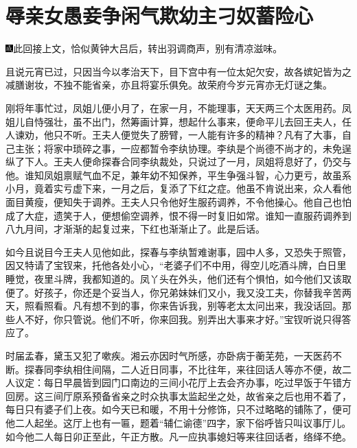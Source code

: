 

\chapter{辱亲女愚妾争闲气\hspace{.5em}欺幼主刁奴蓄险心}

{\includegraphics[width=3mm]{../Images/00005}此回接上文，恰似黄钟大吕后，转出羽调商声，别有清凉滋味。}

且说元宵已过，只因当今以孝治天下，目下宫中有一位太妃欠安，故各嫔妃皆为之减膳谢妆，不独不能省亲，亦且将宴乐俱免。故荣府今岁元宵亦无灯谜之集。

刚将年事忙过，凤姐儿便小月了，在家一月，不能理事，天天两三个太医用药。凤姐儿自恃强壮，虽不出门，然筹画计算，想起什么事来，便命平儿去回王夫人，任人谏劝，他只不听。王夫人便觉失了膀臂，一人能有许多的精神？凡有了大事，自己主张；将家中琐碎之事，一应都暂令李纨协理。李纨是个尚德不尚才的，未免逞纵了下人。王夫人便命探春合同李纨裁处，只说过了一月，凤姐将息好了，仍交与他。谁知凤姐禀赋气血不足，兼年幼不知保养，平生争强斗智，心力更亏，故虽系小月，竟着实亏虚下来，一月之后，复添了下红之症。他虽不肯说出来，众人看他面目黄瘦，便知失于调养。王夫人只令他好生服药调养，不令他操心。他自己也怕成了大症，遗笑于人，便想偷空调养，恨不得一时复旧如常。谁知一直服药调养到八九月间，才渐渐的起复过来，下红也渐渐止了。此是后话。

如今且说目今王夫人见他如此，探春与李纨暂难谢事，园中人多，又恐失于照管，因又特请了宝钗来，托他各处小心，``老婆子们不中用，得空儿吃酒斗牌，白日里睡觉，夜里斗牌，我都知道的。凤丫头在外头，他们还有个惧怕，如今他们又该取便了。好孩子，你还是个妥当人，你兄弟妹妹们又小，我又没工夫，你替我辛苦两天，照看照看。凡有想不到的事，你来告诉我，别等老太太问出来，我没话回。那些人不好，你只管说。他们不听，你来回我。别弄出大事来才好。''宝钗听说只得答应了。

时届孟春，黛玉又犯了嗽疾。湘云亦因时气所感，亦卧病于蘅芜苑，一天医药不断。探春同李纨相住间隔，二人近日同事，不比往年，来往回话人等亦不便，故二人议定：每日早晨皆到园门口南边的三间小花厅上去会齐办事，吃过早饭于午错方回房。这三间厅原系预备省亲之时众执事太监起坐之处，故省亲之后也用不着了，每日只有婆子们上夜。如今天已和暖，不用十分修饰，只不过略略的铺陈了，便可他二人起坐。这厅上也有一匾，题着``辅仁谕德''四字，家下俗呼皆只叫议事厅儿。如今他二人每日卯正至此，午正方散。凡一应执事媳妇等来往回话者，络绎不绝。

